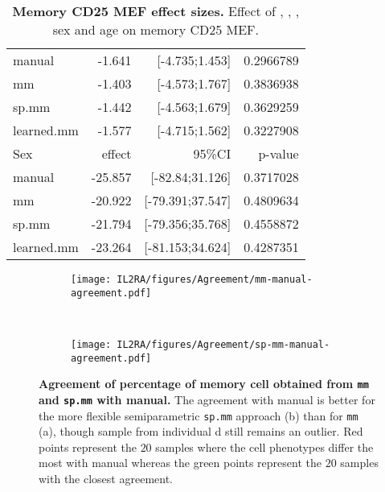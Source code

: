 \begin{table}[h]
\begin{tabular}{lrrr}
manual     & -1.641 & [-4.735;1.453] & 0.2966789\\
mm         & -1.403 & [-4.573;1.767] & 0.3836938\\
sp.mm      & -1.442 & [-4.563;1.679] & 0.3629259\\
learned.mm & -1.577 & [-4.715;1.562] & 0.3227908\\
\rowcolor{Gray}
Sex        & effect  & 95\%CI           & p-value\\
manual     & -25.857 & [-82.84;31.126]  & 0.3717028\\
mm         & -20.922 & [-79.391;37.547] & 0.4809634\\
sp.mm      & -21.794 & [-79.356;35.768] & 0.4558872\\
learned.mm & -23.264 & [-81.153;34.624] & 0.4287351\\
\end{tabular}
\caption{
\label{table:memory-cell-mef-effect}
\textbf{Memory CD25 MEF effect sizes.}
Effect of , , , sex and age on memory CD25 MEF.
}
\end{table}


\begin{figure}[h]
    \begin{subfigure}[b]{.5\textwidth}
        \centering
        \texttt{[image: IL2RA/figures/Agreement/mm-manual-agreement.pdf]}
       \caption{ }
        \label{figure:mm-manual-agreement}
    \end{subfigure}
    ~
    \begin{subfigure}[b]{.5\textwidth}
       \texttt{[image: IL2RA/figures/Agreement/sp-mm-manual-agreement.pdf]}
       \caption{ }
        \label{figure:sp-mm-manual-agreement}
    \end{subfigure}
    \caption{
    \label{figure:memory-percentage-agreement}
    \textbf{Agreement of percentage of memory cell obtained from \texttt{mm} and \texttt{sp.mm} with manual.}
    The agreement with manual is better for the more flexible semiparametric \texttt{sp.mm} approach (b) than for \texttt{mm} (a),
    though sample from individual d still remains an outlier.
    Red points represent the $20$ samples where the cell phenotypes differ the most with manual 
    whereas the green points represent the $20$ samples with the closest agreement.
    }
\end{figure} 

